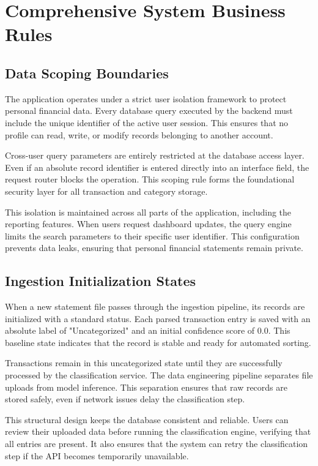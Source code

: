 \section{Comprehensive System Business Rules}

\subsection{Data Scoping Boundaries}
The application operates under a strict user isolation framework to protect personal financial data. Every database query executed by the backend must include the unique identifier of the active user session. This ensures that no profile can read, write, or modify records belonging to another account.

Cross-user query parameters are entirely restricted at the database access layer. Even if an absolute record identifier is entered directly into an interface field, the request router blocks the operation. This scoping rule forms the foundational security layer for all transaction and category storage.

This isolation is maintained across all parts of the application, including the reporting features. When users request dashboard updates, the query engine limits the search parameters to their specific user identifier. This configuration prevents data leaks, ensuring that personal financial statements remain private.

\subsection{Ingestion Initialization States}
When a new statement file passes through the ingestion pipeline, its records are initialized with a standard status. Each parsed transaction entry is saved with an absolute label of "Uncategorized" and an initial confidence score of 0.0. This baseline state indicates that the record is stable and ready for automated sorting.

Transactions remain in this uncategorized state until they are successfully processed by the classification service. The data engineering pipeline separates file uploads from model inference. This separation ensures that raw records are stored safely, even if network issues delay the classification step.

This structural design keeps the database consistent and reliable. Users can review their uploaded data before running the classification engine, verifying that all entries are present. It also ensures that the system can retry the classification step if the API becomes temporarily unavailable.

